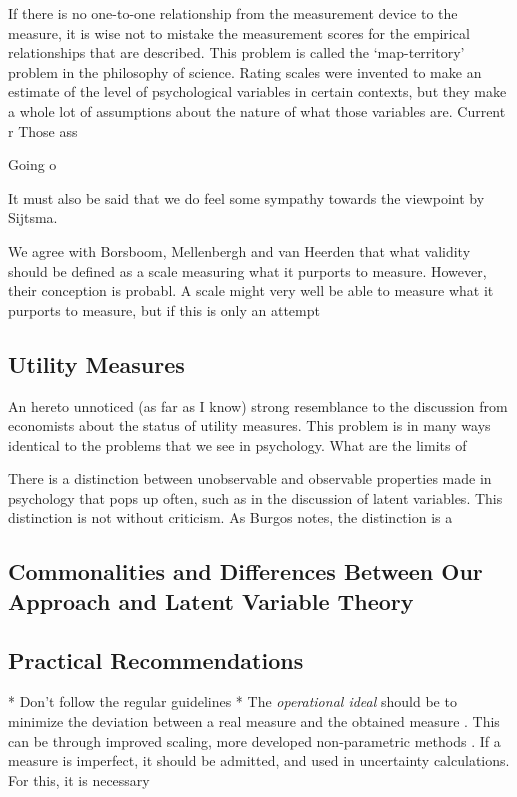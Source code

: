 \documentclass[utf8]{FrontiersinVancouver}
\begin{document}
If there is no one-to-one relationship from the measurement device to the measure, it is wise not to mistake the measurement scores for the empirical relationships that are described. This problem is called the `map-territory' problem in the philosophy of science. Rating scales were invented to make an estimate of the level of psychological variables in certain contexts, but they make a whole lot of assumptions about the nature of what those variables are. Current r Those ass

Going o

It must also be said that we do feel some sympathy towards the viewpoint by Sijtsma\citep{sijtsmaPsychologicalMeasurementPhysics2012}. 

We agree with Borsboom, Mellenbergh and van Heerden that what validity should be defined as a scale measuring what it purports to measure. However, their conception is probabl. A scale might very well be able to measure what it purports to measure, but if this is only an attempt 

\subsection{Utility Measures}
An hereto unnoticed (as far as I know) strong resemblance to the discussion from economists about the status of utility measures. This problem is in many ways  identical to the problems that we see in psychology. What are the limits of 

There is a distinction between unobservable and observable properties made in psychology that pops up often, such as in the discussion of latent variables. This distinction is not without criticism. As Burgos notes, the distinction is a \citep{burgosRealProblemHypothetical2021}

\subsection{Commonalities and Differences Between Our Approach and Latent Variable Theory}
\subsection{Practical Recommendations}
* Don't follow the regular guidelines
* The \textit{operational ideal} should be to minimize the deviation between a real measure and the obtained measure \citep{RealismforRealists}. This can be through improved scaling, more developed non-parametric methods . If a measure is imperfect, it should be admitted, and used in uncertainty calculations. For this, it is necessary 
\end{document}
